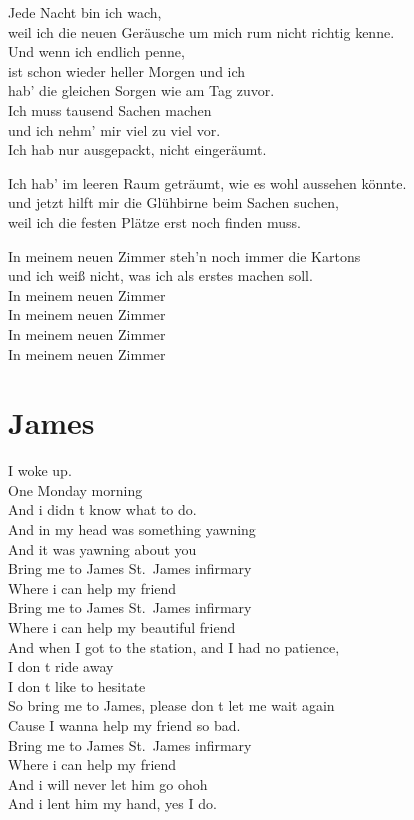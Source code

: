 \documentclass[]{book}
\begin{document}
Jede Nacht bin ich wach,\\
weil ich die neuen Geräusche um mich rum nicht richtig kenne.\\
Und wenn ich endlich penne,\\
ist schon wieder heller Morgen und ich\\
hab' die gleichen Sorgen wie am Tag zuvor.\\
Ich muss tausend Sachen machen\\
und ich nehm' mir viel zu viel vor.\\
Ich hab nur ausgepackt, nicht eingeräumt.

Ich hab' im leeren Raum geträumt, wie es wohl aussehen könnte.\\
und jetzt hilft mir die Glühbirne beim Sachen suchen,\\
weil ich die festen Plätze erst noch finden muss.

In meinem neuen Zimmer steh'n noch immer die Kartons\\
und ich weiß nicht, was ich als erstes machen soll.\\
In meinem neuen Zimmer\\
In meinem neuen Zimmer\\
In meinem neuen Zimmer\\
In meinem neuen Zimmer

\hypertarget{james-1}{%
\section{James}\label{james-1}}

I woke up.\\
One Monday morning\\
And i didn t know what to do.\\
And in my head was something yawning\\
And it was yawning about you\\
Bring me to James St.~James infirmary\\
Where i can help my friend\\
Bring me to James St.~James infirmary\\
Where i can help my beautiful friend\\
And when I got to the station, and I had no patience,\\
I don t ride away\\
I don t like to hesitate\\
So bring me to James, please don t let me wait again\\
Cause I wanna help my friend so bad.\\
Bring me to James St.~James infirmary\\
Where i can help my friend\\
And i will never let him go ohoh\\
And i lent him my hand, yes I do.
\end{document}
